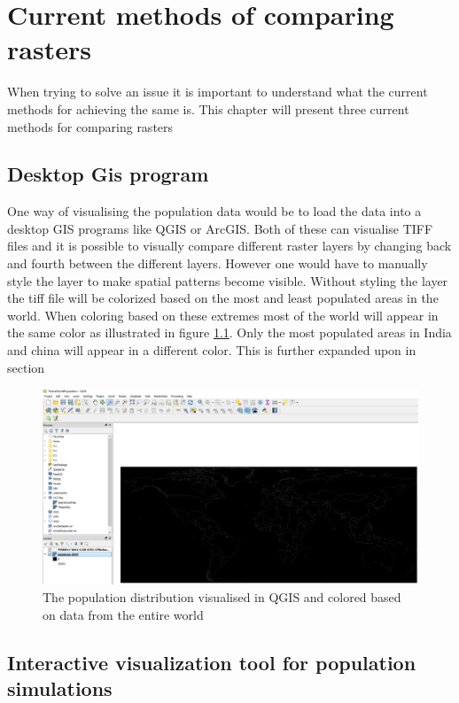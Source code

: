 \chapter{Current methods of comparing rasters}

When trying to solve an issue it is important to understand what the current methods for achieving the same is. This chapter will present three current methods for comparing rasters

\section{Desktop Gis program}

One way of visualising the population data would be to load the data into a desktop GIS programs like QGIS or ArcGIS. Both of these can visualise TIFF files and it is possible to visually compare different raster layers by changing back and fourth between the different layers. However one would have to manually style the layer to make spatial patterns become visible. Without styling the layer the tiff file will be colorized based on the most and least populated areas in the world. When coloring based on these extremes most of the world will appear in the same color as illustrated in figure \ref{QGIS}. Only the most populated areas in India and china will appear in a different color. This is further expanded upon in section 

\begin{figure} [H]
	\centering
	\includegraphics[width=.8\textwidth]{Pictures/QGIS}
	\caption{The population distribution visualised in QGIS and colored based on data from the entire world}
	\label{QGIS}
\end{figure}

\section{Interactive visualization tool for population simulations}

